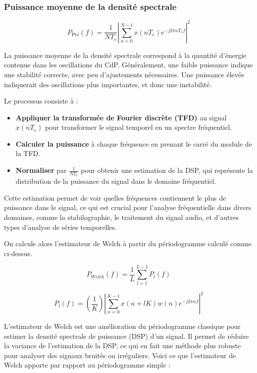 \subsubsection{Puissance moyenne de la densité spectrale}

\begin{equation}
  P_{\text{Per}}(f) = \frac{1}{N T_e} \left| \sum_{n=0}^{N-1} x(nT_e)e^{-j2\pi n T_e f} \right|^2
  \label{eq:P_Per}
\end{equation}

La puissance moyenne de la densité spectrale correspond à la quantité d'énergie contenue dans les oscillations du CdP.
Généralement, une faible puissance indique une stabilité correcte, avec peu d'ajustements nécessaires.
Une puissance élevée indiquerait des oscillations plus importantes, et donc une instabilité.

Le processus consiste à :
\begin{itemize}
    \item \textbf{Appliquer la transformée de Fourier discrète (TFD)} au signal $x(nT_e)$ pour transformer le signal temporel en un spectre fréquentiel.
    \item \textbf{Calculer la puissance} à chaque fréquence en prenant le carré du module de la TFD.
    \item \textbf{Normaliser} par $\frac{1}{N T_e}$ pour obtenir une estimation de la DSP, qui représente la distribution de la puissance du signal dans le domaine fréquentiel.
\end{itemize}

Cette estimation permet de voir quelles fréquences contiennent le plus de puissance dans le signal, ce qui est crucial pour l'analyse fréquentielle dans divers domaines, comme la stabilographie, le traitement du signal audio, et d'autres types d'analyse de séries temporelles.

On calcule alors l’estimateur de Welch à partir du périodogramme calculé comme ci-dessus.

\begin{equation}
  P_{Welch}(f) = \frac{1}{L} \sum_{l=1}^{L-1}P_l(f)
  \label{P_Welch}
\end{equation}

\begin{equation}  
  P_l(f) = \left( \frac{1}{K}\right) \left |\sum_{n=0}^{K-1} x(n+lK) w(n) e^{-j2\pi nf} \right |^2
  \label{eq:Pl_f}
\end{equation}

L'estimateur de Welch est une amélioration du périodogramme classique pour estimer la densité spectrale de puissance (DSP) d'un signal. 
Il permet de réduire la variance de l'estimation de la DSP, ce qui en fait une méthode plus robuste pour analyser des signaux bruités ou irréguliers. 
Voici ce que l'estimateur de Welch apporte par rapport au périodogramme simple :

